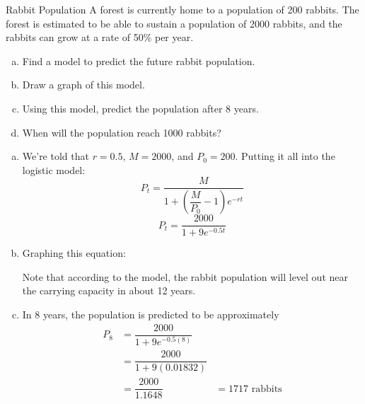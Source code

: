 \begin{example}[https://www.youtube.com/watch?v=mmL2H7_ynUA]{Rabbit Population}
A forest is currently home to a population of 200 rabbits.  The forest is estimated to be able to sustain a population of 2000 rabbits, and the rabbits can grow at a rate of 50\% per year.
\begin{enumerate}[(a)]
\item Find a model to predict the future rabbit population.
\item Draw a graph of this model.
\item Using this model, predict the population after 8 years.
\item When will the population reach 1000 rabbits?
\end{enumerate}

\sol
\begin{enumerate}[(a)]
\item We're told that $r=0.5$, $M=2000$, and $P_0=200$.  Putting it all into the logistic model:
\[P_t = \dfrac{M}{1+\left(\dfrac{M}{P_0}-1\right)e^{-rt}}\]
\[\boxed{P_t = \dfrac{2000}{1+9e^{-0.5t}}}\]

\item Graphing this equation:
\begin{center}
\end{center}
Note that according to the model, the rabbit population will level out near the carrying capacity in about 12 years.

\item In 8 years, the population is predicted to be approximately
\begin{align*}
P_8 &= \dfrac{2000}{1+9e^{-0.5(8)}}\\
&= \dfrac{2000}{1+9(0.01832)}\\
&= \dfrac{2000}{1.1648}
&= \boxed{1717 \textrm{ rabbits}}
\end{align*}


\end{enumerate}
\end{example}
